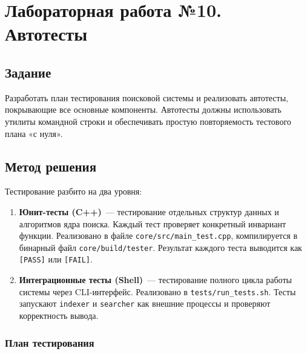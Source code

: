 \documentclass[a4paper,12pt]{article}
\begin{document}
\section{Лабораторная работа №10. Автотесты}

\subsection{Задание}

Разработать план тестирования поисковой системы и реализовать автотесты, покрывающие все основные компоненты. Автотесты должны использовать утилиты командной строки и обеспечивать простую повторяемость тестового плана «с нуля».

\subsection{Метод решения}

Тестирование разбито на два уровня:

\begin{enumerate}
    \item \textbf{Юнит-тесты (C++)}~--- тестирование отдельных структур данных и алгоритмов ядра поиска. Каждый тест проверяет конкретный инвариант функции. Реализовано в файле \texttt{core/src/main\_test.cpp}, компилируется в бинарный файл \texttt{core/build/tester}. Результат каждого теста выводится как \texttt{[PASS]} или \texttt{[FAIL]}.

    \item \textbf{Интеграционные тесты (Shell)}~--- тестирование полного цикла работы системы через CLI-интерфейс. Реализовано в \texttt{tests/run\_tests.sh}. Тесты запускают \texttt{indexer} и \texttt{searcher} как внешние процессы и проверяют корректность вывода.
\end{enumerate}

\subsubsection{План тестирования}
\end{document}
